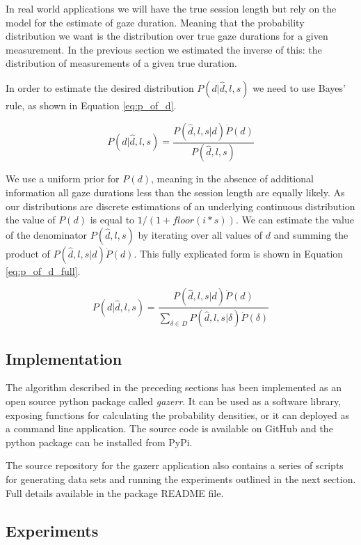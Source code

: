 \documentclass[12pt,a4paper]{article}
\numberwithin{equation}{section}
\begin{document}
In real world applications we will have the true session length but rely on the model for the 
estimate of gaze duration. Meaning that the probability distribution we want is the distribution 
over true gaze durations for a given measurement. In the previous section we estimated the inverse of
this: the distribution of measurements of a given true duration. 

In order to estimate the desired distribution $P(d|\hat{d},l,s)$ we need to use 
Bayes' rule, as shown in Equation \ref{eq:p_of_d}.

\begin{equation}
\label{eq:p_of_d}
P(d|\hat{d},l,s) =  \frac{ P(\hat{d},l,s|d) \dot P(d) }{ P(\hat{d},l,s)  }
\end{equation}

We use a uniform prior for $P(d)$, meaning in the absence of additional information all
gaze durations less than the session length are equally likely. As our distributions are
discrete estimations of an underlying continuous distribution the value of $P(d)$ is
equal to $1/(1+floor(i*s))$. We can estimate the value
of the denominator $P(\hat{d},l,s)$ by iterating over all values of $d$ and summing the product
of $ P(\hat{d},l,s|d) \dot P(d)$. This fully explicated form is shown in 
Equation \ref{eq:p_of_d_full}.

\begin{equation}
\label{eq:p_of_d_full}
P(d|\hat{d},l,s) =  \frac{ P(\hat{d},l,s|d) \dot P(d) }{ \sum_{\delta \in D} P(\hat{d},l,s|\delta) \dot P(\delta)  }
\end{equation}

\subsection{Implementation}

The algorithm described in the preceding sections has been implemented as an open source python 
package called \textit{gazerr}. 
It can be used as a software library, exposing functions for calculating the probability densities,
or it can deployed as a command line application. 
The source code is available on GitHub and the python package can be installed from PyPi.

The source repository for the gazerr application also contains a series of scripts for generating data
sets and running the experiments outlined in the next section. Full details available in the package
README file.

\subsection{Experiments}
\end{document}
